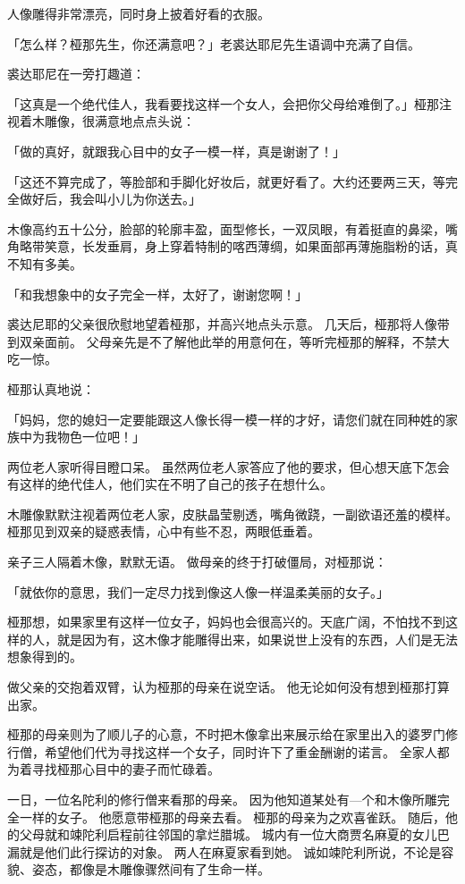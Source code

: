 \documentclass[twoside,openany]{book}
\begin{document}
人像雕得非常漂亮，同时身上披着好看的衣服。

「怎么样？桠那先生，你还满意吧？」老裘达耶尼先生语调中充满了自信。

裘达耶尼在一旁打趣道：

「这真是一个绝代佳人，我看要找这样一个女人，会把你父母给难倒了。」桠那注视着木雕像，很满意地点点头说：

「做的真好，就跟我心目中的女子一模一样，真是谢谢了！」

「这还不算完成了，等脸部和手脚化好妆后，就更好看了。大约还要两三天，等完全做好后，我会叫小儿为你送去。」

木像高约五十公分，脸部的轮廓丰盈，面型修长，一双凤眼，有着挺直的鼻梁，嘴角略带笑意，长发垂肩，身上穿着特制的喀西薄绸，如果面部再薄施脂粉的话，真不知有多美。

「和我想象中的女子完全一样，太好了，谢谢您啊！」

裘达尼耶的父亲很欣慰地望着桠那，并高兴地点头示意。
几天后，桠那将人像带到双亲面前。
父母亲先是不了解他此举的用意何在，等听完桠那的解释，不禁大吃一惊。

桠那认真地说：

「妈妈，您的媳妇一定要能跟这人像长得一模一样的才好，请您们就在同种姓的家族中为我物色一位吧！」

两位老人家听得目瞪口呆。
虽然两位老人家答应了他的要求，但心想天底下怎会有这样的绝代佳人，他们实在不明了自己的孩子在想什么。

木雕像默默注视着两位老人家，皮肤晶莹剔透，嘴角微跷，一副欲语还羞的模样。
桠那见到双亲的疑惑表情，心中有些不忍，两眼低垂着。

亲子三人隔着木像，默默无语。
做母亲的终于打破僵局，对桠那说：

「就依你的意思，我们一定尽力找到像这人像一样温柔美丽的女子。」

桠那想，如果家里有这样一位女子，妈妈也会很高兴的。天底广阔，不怕找不到这样的人，就是因为有，这木像才能雕得出来，如果说世上没有的东西，人们是无法想象得到的。

做父亲的交抱着双臂，认为桠那的母亲在说空话。
他无论如何没有想到桠那打算出家。

桠那的母亲则为了顺儿子的心意，不时把木像拿出来展示给在家里出入的婆罗门修行僧，希望他们代为寻找这样一个女子，同时许下了重金酬谢的诺言。
全家人都为着寻找桠那心目中的妻子而忙碌着。

一日，一位名陀利的修行僧来看那的母亲。
因为他知道某处有—个和木像所雕完全一样的女子。
他愿意带桠那的母亲去看。
桠那的母亲为之欢喜雀跃。
随后，他的父母就和竦陀利启程前往邻国的拿烂腊城。
城内有一位大商贾名麻夏的女儿巴漏就是他们此行探访的对象。
两人在麻夏家看到她。
诚如竦陀利所说，不论是容貌、姿态，都像是木雕像骤然间有了生命一样。
\end{document}
